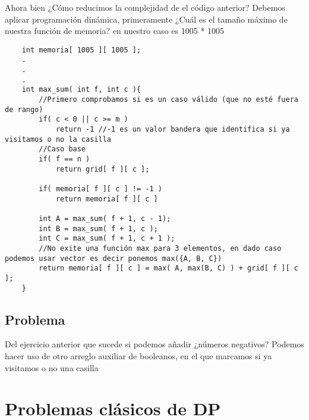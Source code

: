 Ahora bien ¿Cómo reducimos la complejidad de el código anterior? Debemos aplicar programación dinámica, primeramente ¿Cuál es el tamaño máximo de nuestra función de memoria? en nuestro caso es 1005 * 1005

\begin{lstlisting}
    int memoria[ 1005 ][ 1005 ];
    .
    .
    .
    int max_sum( int f, int c ){
        //Primero comprobamos si es un caso válido (que no esté fuera de rango)
        if( c < 0 || c >= m )
            return -1 //-1 es un valor bandera que identifica si ya visitamos o no la casilla
        //Caso base
        if( f == n )
            return grid[ f ][ c ];

        if( memoria[ f ][ c ] != -1 )
            return memoria[ f ][ c ]

        int A = max_sum( f + 1, c - 1);
        int B = max_sum( f + 1, c );
        int C = max_sum( f + 1, c + 1 );
        //No exite una función max para 3 elementos, en dado caso podemos usar vector es decir ponemos max({A, B, C})
        return memoria[ f ][ c ] = max( A, max(B, C) ) + grid[ f ][ c ];
    }
\end{lstlisting}

\section{Problema}
Del ejercicio anterior que sucede si podemos añadir ¿números negativos? Podemos hacer uso de otro arreglo auxiliar de booleanos, en el que marcamos si ya visitamos o no una casilla

\chapter{Problemas clásicos de DP}
